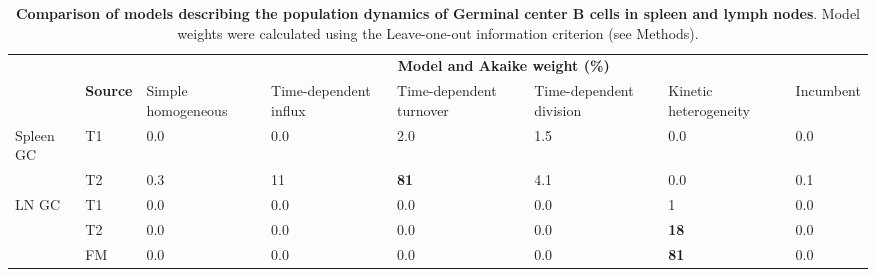 \documentclass[12pt]{article}
\begin{document}
	\begin{table}[htbp]
		\begin{center}
			\renewcommand{\arraystretch}{1.25}
			{\small
				\begin{tabular}{p{1.7cm} p{1.4cm} p{2cm} p{1.8cm} p{1.8cm} p{1.8cm} p{1.8cm} p{1.8cm}}
					\toprule
					&  & \multicolumn{6}{c}{\textbf{Model and Akaike weight (\%)}} \\
					\cline{3-8}
					                & \textbf{Source} & Simple homogeneous & Time-dependent influx & Time-dependent turnover  &  Time-dependent division &  Kinetic heterogeneity & Incumbent  \\ 
					\toprule
					Spleen GC       &   T1    &   0.0     &    0.0     &              2.0                &    1.5     &   0.0    &  0.0     \\
					                &   T2    &   0.3     &    11      & \cellcolor{blue!15} \textbf{81} &    4.1     &   0.0    &  0.1     \\
					\hline
					LN GC           &   T1    &   0.0     &   0.0      &    0.0      &    0.0     &    1                                 &    0.0    \\ 
				                    &   T2    &   0.0     &   0.0      &    0.0      &    0.0     &  \cellcolor{blue!15}  \textbf{18}    &    0.0    \\ 
				                    &   FM    &   0.0     &   0.0      &    0.0      &    0.0     &  \cellcolor{blue!15}  \textbf{81}    &    0.0    \\
				    \hline
				    \toprule
			    \end{tabular}
		    }
		\end{center}
		\caption{ \textbf{Comparison of models describing the population dynamics of Germinal center B cells in spleen and lymph nodes}. Model weights were calculated using the Leave-one-out information criterion (see Methods).} 
		\label{tab:GC-AICs}
	\end{table} 



	
\end{document}
